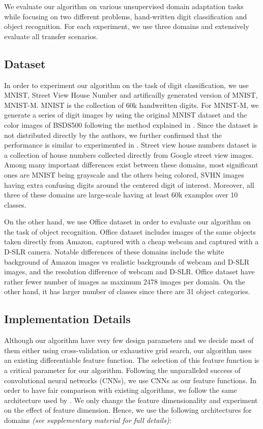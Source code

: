 We evaluate our algorithm on various unsupervised domain adaptation tasks while focusing on two different problems, hand-written digit classification and object recognition. For each experiment, we use three domains and extensively evaluate all transfer scenarios.

\subsection{Dataset}
In order to experiment our algorithm on the task of digit classification, we use MNIST\cite{mnist}, Street View House Number\cite{svhn} and artificailly generated version of MNIST, MNIST-M\cite{ganin15}. MNIST is the collection of 60k handwritten digits. For MNIST-M, we generate a series of digit images by using the original MNIST dataset and the color images of BSDS500\cite{bsds500} following the method explained in \cite{ganin15}. Since the dataset is not distributed directly by the authors, we further confirmed that the performance is similar to experimented in \cite{ganin15}. Street view house numbers dataset is a collection of house numbers collected directly from Google street view images. Among many important differences exist between these domains, most significant ones are MNIST being grayscale and the others being colored, SVHN images having extra confusing digits around the centered digit of interest. Moreover, all three of these domains are large-scale having at least 60k examples over 10 classes. 

On the other hand, we use Office\cite{office} dataset in order to evaluate our algorithm on the task of object recognition. Office dataset includes images of the same objects taken directly from Amazon, captured with a cheap webcam and captured with a D-SLR camera. Notable differences of these domains include the white background of Amazon images vs realistic backgrounds of webcam and D-SLR images, and the resolution difference of webcam and D-SLR. Office dataset have rather fewer number of images as maximum 2478 images per domain. On the other hand, it has larger number of classes since there are 31 object categories.

\subsection{Implementation Details}
Although our algorithm have very few design parameters and we decide most of them either using cross-validation or exhaustive grid search, our algorithm uses an existing differentiable feature function. The selection of this feature function is a critical parameter for our algorithm. Following the unparalleled success of convolutional neural networks (CNNs), we use CNNs as our feature functions.  In order to have  fair comparison with existing algorithms, we follow the same architecture used by \cite{ganin15}. We only change the feature dimensionality and experiment on the effect of feature dimension. Hence, we use the following architectures for domains \emph{(see supplementary material for full details)}:

